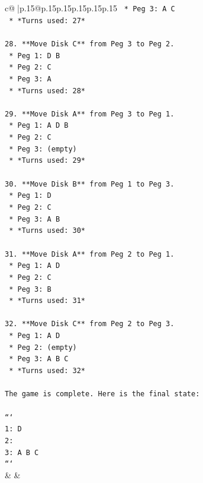\documentclass{article}
\begin{document}
{\begin{supertabular}{c@{$\;$}|p{.15\linewidth}@{}p{.15\linewidth}p{.15\linewidth}p{.15\linewidth}p{.15\linewidth}p{.15\linewidth}}
{{{\texttt{    *   Peg 3: A C} \\
\texttt{    *   *Turns used: 27*} \\
\\ 
\texttt{28. **Move Disk C** from Peg 3 to Peg 2.} \\
\texttt{    *   Peg 1: D B} \\
\texttt{    *   Peg 2: C} \\
\texttt{    *   Peg 3: A} \\
\texttt{    *   *Turns used: 28*} \\
\\ 
\texttt{29. **Move Disk A** from Peg 3 to Peg 1.} \\
\texttt{    *   Peg 1: A D B} \\
\texttt{    *   Peg 2: C} \\
\texttt{    *   Peg 3: (empty)} \\
\texttt{    *   *Turns used: 29*} \\
\\ 
\texttt{30. **Move Disk B** from Peg 1 to Peg 3.} \\
\texttt{    *   Peg 1: D} \\
\texttt{    *   Peg 2: C} \\
\texttt{    *   Peg 3: A B} \\
\texttt{    *   *Turns used: 30*} \\
\\ 
\texttt{31. **Move Disk A** from Peg 2 to Peg 1.} \\
\texttt{    *   Peg 1: A D} \\
\texttt{    *   Peg 2: C} \\
\texttt{    *   Peg 3: B} \\
\texttt{    *   *Turns used: 31*} \\
\\ 
\texttt{32. **Move Disk C** from Peg 2 to Peg 3.} \\
\texttt{    *   Peg 1: A D} \\
\texttt{    *   Peg 2: (empty)} \\
\texttt{    *   Peg 3: A B C} \\
\texttt{    *   *Turns used: 32*} \\
\\ 
\texttt{The game is complete. Here is the final state:} \\
\\ 
\texttt{```} \\
\texttt{1: D} \\
\texttt{2: } \\
\texttt{3: A B C} \\
\texttt{```} \\
            }
        }
    }
    & & \\ \\


\end{supertabular}}
\end{document}
